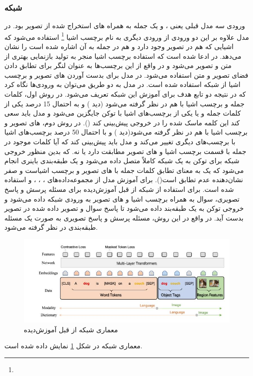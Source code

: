 \subsubsection{شبکه }
	ورودی سه مدل قبلی یعنی 
	،
	و 
	یک جمله به همراه 
	های استخراج شده از تصویر بود. در مدل 
	علاوه بر این دو ورودی از ورودی دیگری به نام برچسب اشیا
	\footnote{}
	استفاده می‌شود که اشیایی که هم در تصویر وجود دارد و هم در جمله به آن اشاره شده است را نشان می‌دهد. در 
	\cite{li2020oscar}
ادعا شده است که استفاده برچسب اشیا منجر به تولید بازنمایی بهتری از متن و تصویر می‌شود و در واقع از این برچسب‌ها به عنوان لنگر برای تطابق دادن فضای تصویر و متن استفاده می‌شود. در مدل
	برای بدست آوردن 
	های تصویر و برچسب اشیا از شبکه 
	استفاده شده است. در مدل 
	به دو طریق می‌توان به ورود‌ی‌ها نگاه کرد که در نتیجه دو تابع هدف برای آموزش این شبکه تعریف می‌شود. در روش اول، کلمات جمله و برچسب اشیا با هم در نظر گرفته می‌شود (دید ) و به احتمال 15 درصد یکی از کلمات جمله و یا یکی از برچسب‌های اشیا با توکن 
	\lr{[MASK]}
	جایگزین می‌شود و مدل باید سعی کند این کلمه ماسک شده را در خروجی پیش‌بینی کند
	().
	در روش دوم،
	های تصویر و برچسب اشیا با هم در نظر گرفته می‌شود(دید ) و با احتمال 50 درصد برچسب‌های اشیا با برچسب‌های دیگری تغییر می‌کند و مدل باید پیش‌بینی کند که آیا کلمات موجود در جمله با قسمت برچسب اشیا و 
	های تصویر مطابقت دارد یا نه. که بدین منظور خروجی شبکه برای توکن
	\lr{[CLS]}
	به یک شبکه کاملاً متصل داده می‌شود و یک طبقه‌بندی باینری انجام می‌شود که یک به معنای تطابق کلمات جمله با 
	های تصویر و برچسب اشیاست و صفر نشان‌دهنده عدم تطابق است().  برای آموزش مدل 
	از مجموعه‌داده‌های
	،
	،
	،
	و
	استفاده شده است. برای استفاده از شبکه از قبل آموزش‌دیده
	برای مسئله پرسش و پاسخ تصویری، سوال به همراه برچسب اشیا و 
	های تصویر به ورودی شبکه داده ‌می‌شود و خروجی توکن
	\lr{[CLS]}
	به یک طبقه‌بند داده ‌می‌شود تا پاسخ سوال و تصویر داده شده در تصویر بدست آید. در واقع در این روش، مسئله پرسش و پاسخ تصویری به صورت یک مسئله طبقه‌بندی در نظر گرفته ‌می‌شود.
	\begin{figure}
		\centerline{\includegraphics[scale=0.7]{images/OSCAR.JPG}}
		\caption[معماری شبکه از قبل آموزش‌دیده]{معماری شبکه از قبل آموزش‌دیده\cite{li2020oscar}}
		\label{fig:OSCAR}
	\end{figure}
	معماری شبکه 
	در شکل 
	\ref{fig:OSCAR}
	نمایش داده شده است.
	

